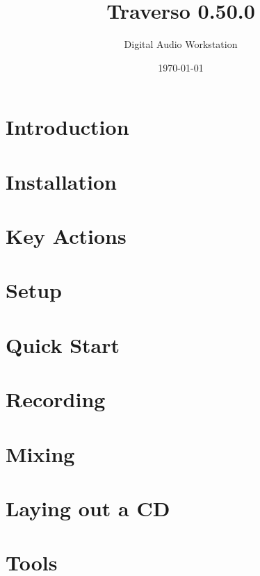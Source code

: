 \documentclass[a4paper,
               12pt,
               pdftex,
               twoside,
               smallheadings,
               headinclude,
               headsepline,
               DIV16,
               BCOR10mm,
               halfparskip
               ]{scrreprt}
\newcommand{\clearemptydoublepage}{\newpage\thispagestyle{empty}\cleardoublepage}
\begin{document}
\title{Traverso 0.50.0}
\author{Digital Audio Workstation}
\date{\today}

\begin{titlepage}
  
\end{titlepage}
  \clearemptydoublepage
  
  \clearemptydoublepage

\setcounter{page}{1}


\tableofcontents


\chapter{Introduction\label{sect_introduction}}

\chapter{Installation\label{sect_installation}}

\chapter{Key Actions\label{sect_keyactions}}

\chapter{Setup\label{sect_setup}}

\chapter{Quick Start\label{sect_quickstart}}

\chapter{Recording\label{sect_recording}}

\chapter{Mixing\label{sect_mixing}}

\chapter{Laying out a CD\label{sect_cdburning}}

\chapter{Tools\label{sect_tools}}

\end{document}
